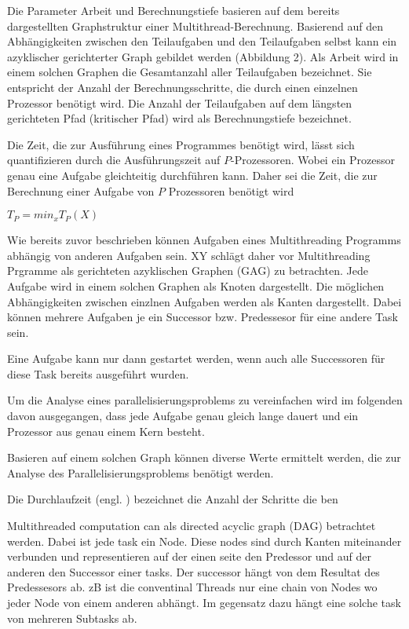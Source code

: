 Die Parameter Arbeit und Berechnungstiefe basieren auf dem bereits dargestellten Graphstruktur einer Multithread-Berechnung. Basierend auf den Abhängigkeiten zwischen den Teilaufgaben und den Teilaufgaben selbst kann ein azyklischer gerichterter Graph gebildet werden (Abbildung 2). Als Arbeit wird in einem solchen Graphen die Gesamtanzahl aller Teilaufgaben bezeichnet. Sie entspricht der Anzahl der Berechnungsschritte, die durch einen einzelnen Prozessor benötigt wird. Die Anzahl der Teilaufgaben auf dem längsten gerichteten Pfad (kritischer Pfad) wird als Berechnungstiefe bezeichnet.

Die Zeit, die zur Ausführung eines Programmes benötigt wird, lässt sich quantifizieren durch die Ausführungszeit auf $P$-Prozessoren. Wobei ein Prozessor genau eine Aufgabe gleichteitig durchführen kann. Daher sei die Zeit, die zur Berechnung einer Aufgabe von $P$ Prozessoren benötigt wird

$T_P = min_x T_P(X)$






Wie bereits zuvor beschrieben können Aufgaben eines Multithreading Programms abhängig von anderen Aufgaben sein. XY schlägt daher vor Multithreading Prgramme als gerichteten azyklischen Graphen (GAG) zu betrachten. Jede Aufgabe wird in einem solchen Graphen als Knoten dargestellt. Die möglichen Abhängigkeiten zwischen einzlnen Aufgaben werden als Kanten dargestellt. Dabei können mehrere Aufgaben je ein Successor bzw. Predessesor für eine andere Task sein.

Eine Aufgabe kann nur dann gestartet werden, wenn auch alle Successoren für diese Task bereits ausgeführt wurden. 

Um die Analyse eines parallelisierungsproblems zu vereinfachen wird im folgenden davon ausgegangen, dass jede Aufgabe genau gleich lange dauert und ein Prozessor aus genau einem Kern besteht.


Basieren auf einem solchen Graph können diverse Werte ermittelt werden, die zur Analyse des Parallelisierungsproblems benötigt werden. 

Die Durchlaufzeit (engl. ) bezeichnet die Anzahl der Schritte die ben





Multithreaded computation can als directed acyclic graph (DAG) betrachtet werden. Dabei ist jede task ein Node. Diese nodes sind durch Kanten miteinander verbunden und representieren auf der einen seite den Predessor und auf der anderen den Successor einer tasks. Der successor hängt von dem Resultat des Predessesors ab. zB ist die conventinal Threads nur eine chain von Nodes wo jeder Node von einem anderen abhängt. Im gegensatz dazu hängt eine solche task von mehreren Subtasks ab.

